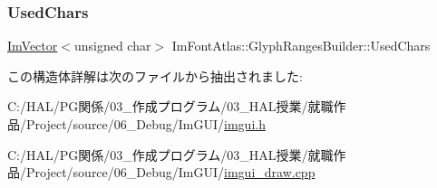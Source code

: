 \subsubsection{\texorpdfstring{Used\+Chars}{UsedChars}}
{\footnotesize\ttfamily \mbox{\hyperlink{class_im_vector}{Im\+Vector}}$<$unsigned char$>$ Im\+Font\+Atlas\+::\+Glyph\+Ranges\+Builder\+::\+Used\+Chars}



この構造体詳解は次のファイルから抽出されました\+:\begin{DoxyCompactItemize}
\item 
C\+:/\+H\+A\+L/\+P\+G関係/03\+\_\+作成プログラム/03\+\_\+\+H\+A\+L授業/就職作品/\+Project/source/06\+\_\+\+Debug/\+Im\+G\+U\+I/\mbox{\hyperlink{imgui_8h}{imgui.\+h}}\item 
C\+:/\+H\+A\+L/\+P\+G関係/03\+\_\+作成プログラム/03\+\_\+\+H\+A\+L授業/就職作品/\+Project/source/06\+\_\+\+Debug/\+Im\+G\+U\+I/\mbox{\hyperlink{imgui__draw_8cpp}{imgui\+\_\+draw.\+cpp}}\end{DoxyCompactItemize}
